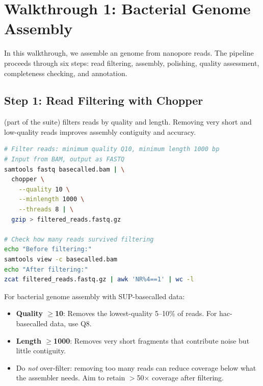\section{Walkthrough 1: Bacterial Genome Assembly}
\label{sec:diyanalysis:bacterial}

In this walkthrough, we assemble an  genome from nanopore reads. The pipeline proceeds through six steps: read filtering, assembly, polishing, quality assessment, completeness checking, and annotation.

\subsection{Step 1: Read Filtering with Chopper}
\label{subsec:diyanalysis:chopper}

 (part of the  suite) filters reads by quality and length. Removing very short and low-quality reads improves assembly contiguity and accuracy.

\begin{lstlisting}[language=bash,caption={Filtering reads with chopper.},label=lst:diy-chopper]
# Filter reads: minimum quality Q10, minimum length 1000 bp
# Input from BAM, output as FASTQ
samtools fastq basecalled.bam | \
  chopper \
    --quality 10 \
    --minlength 1000 \
    --threads 8 | \
  gzip > filtered_reads.fastq.gz

# Check how many reads survived filtering
echo "Before filtering:"
samtools view -c basecalled.bam
echo "After filtering:"
zcat filtered_reads.fastq.gz | awk 'NR%4==1' | wc -l
\end{lstlisting}

\begin{tipbox}[title={Choosing Filter Thresholds}]
For bacterial genome assembly with SUP-basecalled data:
\begin{itemize}[nosep]
  \item \textbf{Quality $\geq$10}: Removes the lowest-quality 5--10\% of reads. For hac-basecalled data, use Q8.
  \item \textbf{Length $\geq$1000\basepair{}}: Removes very short fragments that contribute noise but little contiguity.
  \item Do \emph{not} over-filter: removing too many reads can reduce coverage below what the assembler needs. Aim to retain $>$50$\times$ coverage after filtering.
\end{itemize}
\end{tipbox}

